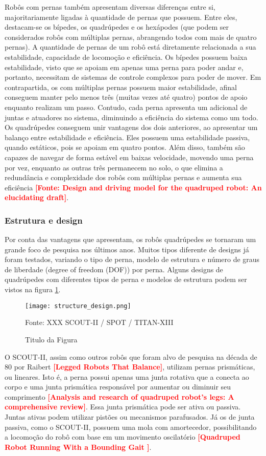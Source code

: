 \documentclass[../main.tex]{subfiles}
\begin{document}
  Robôs com pernas também apresentam diversas diferenças entre si, majoritariamente ligadas à quantidade de pernas que possuem. Entre eles, destacam-se os bípedes, os quadrúpedes e os hexápodes (que podem ser considerados robôs com múltiplas pernas, abrangendo todos com mais de quatro pernas). A quantidade de pernas de um robô está diretamente relacionada a sua estabilidade, capacidade de locomoção e eficiência. Os bípedes possuem baixa estabilidade, visto que se apoiam em apenas uma perna para poder andar e, portanto, necessitam de sistemas de controle complexos para poder de mover. Em contrapartida, os com múltiplas pernas possuem maior estabilidade, afinal conseguem manter pelo menos três (muitas vezes até quatro) pontos de apoio enquanto realizam um passo. Contudo, cada perna apresenta um adicional de juntas e atuadores no sistema, diminuindo a eficiência do sistema como um todo. Os quadrúpedes conseguem unir vantagens dos dois anteriores, ao apresentar um balanço entre estabilidade e eficiência. Eles possuem uma estabilidade passiva, quando estáticos, pois se apoiam em quatro pontos. Além disso, também são capazes de navegar de forma estável em baixas velocidade, movendo uma perna por vez, enquanto as outras três permanecem no solo, o que elimina a redundância e complexidade dos robôs com múltiplas pernas e aumenta sua eficiência \textbf{\textcolor{red}{[Fonte: Design and driving model for the quadruped robot: An elucidating draft]}}.

  \subsubsection{Estrutura e design}
  Por conta das vantagens que apresentam, os robôs quadrúpedes se tornaram um grande foco de pesquisa nos últimos anos. Muitos tipos diferente de designs já foram testados, variando o tipo de perna, modelo de estrutura e número de graus de liberdade (degree of freedom (DOF)) por perna. Alguns designs de quadrúpedes com diferentes tipos de perna e modelos de estrutura podem ser vistos na figura \ref{fig:structure_design}.

  \begin{figure}[h]
    \centering
    \caption{Titulo da Figura}
    \texttt{[image: structure\_design.png]}
    
    Fonte: XXX
    SCOUT-II / SPOT / TITAN-XIII
    \label{fig:structure_design}
  \end{figure}

  O SCOUT-II, assim como outros robôs que foram alvo de pesquisa na década de 80 por Raibert \textbf{\textcolor{red}{[Legged Robots That Balance]}}, utilizam pernas prismáticas, ou lineares. Isto é, a perna possui apenas uma junta rotativa que a conecta ao corpo e uma junta prismática responsável por aumentar ou diminuir seu comprimento \textbf{\textcolor{red}{[Analysis and research of quadruped robot's legs: A comprehensive review]}}. Essa junta prismática pode ser ativa ou passiva. Juntas ativas podem utilizar pistões ou mecanismos parafusados. Já os de junta passiva, como o SCOUT-II, possuem uma mola com amortecedor, possibilitando a locomoção do robô com base em um movimento oscilatório \textbf{\textcolor{red}{[Quadruped Robot Running With a Bounding Gait ]}}.
\end{document}
